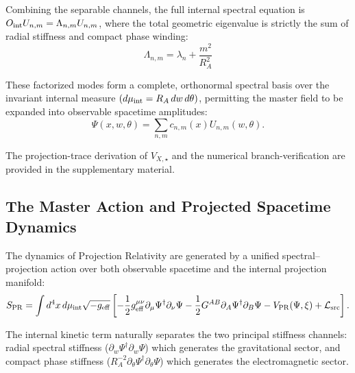 \documentclass[11pt]{article}
\begin{document}
Combining the separable channels, the full internal spectral equation is \(O_{\rm int}U_{n,m}=\Lambda_{n,m}U_{n,m}\), where the total geometric eigenvalue is strictly the sum of radial stiffness and compact phase winding:
\begin{equation}
\boxed{
\Lambda_{n,m}
=
\lambda_n
+
\frac{m^2}{R_A^2}
}
\end{equation}

These factorized modes form a complete, orthonormal spectral basis over the invariant internal measure \((d\mu_{\rm int}=R_A\,dw\,d\theta)\), permitting the master field to be expanded into observable spacetime amplitudes:
\begin{equation}
\Psi(x,w,\theta)
=
\sum_{n,m}
c_{n,m}(x)U_{n,m}(w,\theta).
\end{equation}

The projection-trace derivation of \(V_{X,\star}\) and the numerical branch-verification are provided in the supplementary material.

\subsection{The Master Action and Projected Spacetime Dynamics}
\label{sec:master_action_and_dynamics}

The dynamics of Projection Relativity are generated by a unified spectral–projection action \cite{GellMannLevy1960,  peskin1995introduction} over both observable spacetime and the internal projection manifold:
\begin{equation}
S_{\rm PR} = \int d^4x \, d\mu_{\rm int} \sqrt{-g_{\rm eff}} \left[ -\frac{1}{2} g_{\rm eff}^{\mu\nu} \partial_\mu \Psi^\dagger \partial_\nu \Psi - \frac{1}{2} G^{AB} \partial_A \Psi^\dagger \partial_B \Psi - V_{\rm PR}(\Psi, \xi) + \mathcal{L}_{\rm src} \right].
\end{equation}

The internal kinetic term naturally separates the two principal stiffness channels: radial spectral stiffness ($\partial_w \Psi^\dagger \partial_w \Psi$) which generates the gravitational sector, and compact phase stiffness ($R_A^{-2} \partial_\theta \Psi^\dagger \partial_\theta \Psi$) which generates the electromagnetic sector.
\end{document}
